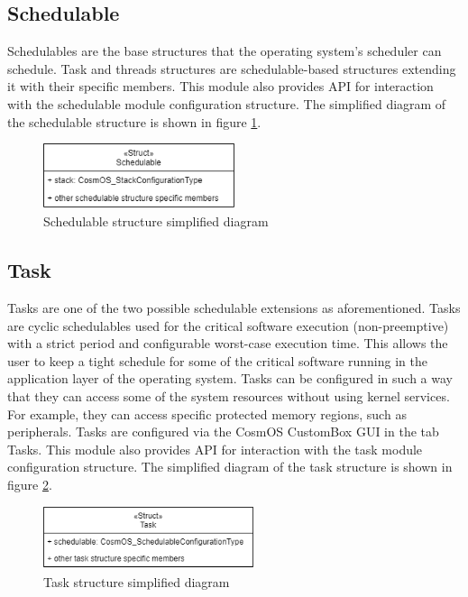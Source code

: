 \subsection{Schedulable}\label{schedulable}
Schedulables are the base structures that the operating system's scheduler can schedule. Task and threads structures are schedulable-based structures extending it with their specific members. This module also provides \ac{API} for interaction with the schedulable module configuration structure. The simplified diagram of the schedulable structure is shown in figure \ref{fig:schedulableStructure}.

\begin{figure}[H]
\begin{center}
\includegraphics[width=0.5\textwidth]{images/schedulable_structure.png}
\caption{Schedulable structure simplified diagram}
\label{fig:schedulableStructure}
\end{center}
\end{figure}

\subsection{Task}
Tasks are one of the two possible schedulable extensions as aforementioned. Tasks are cyclic schedulables used for the critical software execution (non-preemptive) with a strict period and configurable worst-case execution time. This allows the user to keep a tight schedule for some of the critical software running in the application layer of the operating system. Tasks can be configured in such a way that they can access some of the system resources without using kernel services. For example, they can access specific protected memory regions, such as peripherals. Tasks are configured via the CosmOS CustomBox \ac{GUI} in the tab Tasks. This module also provides \ac{API} for interaction with the task module configuration structure. The simplified diagram of the task structure is shown in figure \ref{fig:taskStructure}.

\begin{figure}[H]
\begin{center}
\includegraphics[width=0.55\textwidth]{images/task_structure.png}
\caption{Task structure simplified diagram}
\label{fig:taskStructure}
\end{center}
\end{figure}

